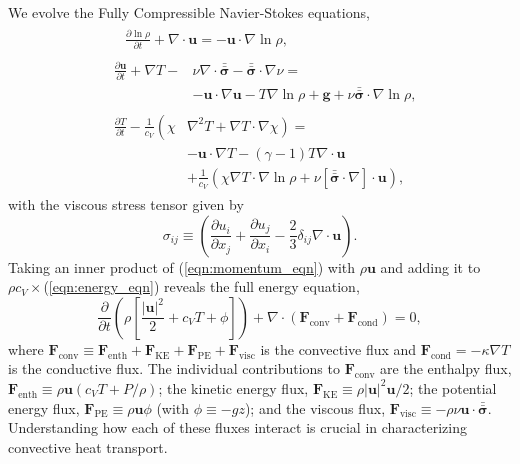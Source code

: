 \documentclass[aps, prl, twocolumn, nofootinbib, groupedaddress, amsfonts, amssymb, amsmath]{revtex4-1}
\newcommand{\Div}[1]{\ensuremath{\nabla\cdot\left( #1\right)}}
\newcommand{\grad}{\ensuremath{\nabla}}
\newcommand{\lilstressT}{\ensuremath{\bm{\bar{\bar{\sigma}}}}}
\begin{document}
We evolve the Fully Compressible Navier-Stokes equations,
\begin{align}
&\begin{aligned}
&\frac{\partial \ln\rho}{\partial t} + \grad\cdot\bm{u} 
    = -\bm{u}\cdot\grad\ln\rho,
	\label{eqn:continuity_eqn}
\end{aligned}\\
&\begin{aligned}
\frac{\partial\bm{u}}{\partial t} + \grad T - 
&\nu\grad\cdot\lilstressT - \lilstressT\cdot\grad\nu = \\
&-\bm{u}\cdot\grad\bm{u} - T\grad\ln\rho + \bm{g} + 
\nu\lilstressT\cdot\grad\ln\rho,
\label{eqn:momentum_eqn}
\end{aligned}\\
&\begin{aligned}
\frac{\partial T}{\partial t} -\frac{1}{c_V}\left(\right.\chi&\left.
    \grad^2 T + \grad T\cdot\grad\chi\right) = \\
	&-\bm{u}\cdot\grad T - (\gamma-1)T\grad\cdot{\bm{u}} \\
	&+ \frac{1}{c_V}\left(\chi\grad T \cdot\grad\ln\rho +
	\nu\left[\lilstressT\cdot\nabla\right]\cdot\bm{u}\right), 
	\label{eqn:energy_eqn}
\end{aligned}
\end{align}
with the viscous stress tensor given by
\begin{equation}
\sigma_{ij} \equiv \left(\frac{\partial u_i}{\partial x_j} + 
\frac{\partial u_j}{\partial x_i} - \frac{2}{3}\delta_{ij}\grad\cdot\bm{u}\right).
	\label{eqn:stress_tensor}
\end{equation}
Taking an inner product of
(\ref{eqn:momentum_eqn}) with $\rho\bm{u}$ and adding it to 
$\rho c_V\times$(\ref{eqn:energy_eqn}) reveals the full energy equation,
\begin{equation}
\frac{\partial}{\partial t}\left(\rho\left[\frac{|\bm{u}|^2}{2} + c_V T + \phi\right]\right) +
\Div{\bm{F}_{\text{conv}} + \bm{F}_{\text{cond}}} = 0,
	\label{eqn:energy_eqn_full}
\end{equation}
where
$
\bm{F}_{\text{conv}} \equiv \bm{F}_{\text{enth}} + \bm{F}_{\text{KE}} + \bm{F}_{\text{PE}} + \bm{F}_{\text{visc}}
$
is the convective flux and $\bm{F}_{\text{cond}} = -\kappa \grad T$
is the conductive flux.
The individual contributions to $\bm{F}_{\text{conv}}$ are the enthalpy flux, 
$\bm{F}_{\text{enth}} \equiv \rho\bm{u}(c_V T + P/\rho)$;
the kinetic energy flux, 
$\bm{F}_{\text{KE}} \equiv \rho|\bm{u}|^2\bm{u}/2$;
the potential energy flux,
$\bm{F}_{\text{PE}} \equiv \rho\bm{u}\phi$ (with $\phi \equiv -gz$);
and the viscous flux, 
$\bm{F}_{\text{visc}} \equiv -\rho\nu\bm{u}\cdot\lilstressT$.
Understanding how each of these fluxes interact  
is crucial in characterizing convective heat transport.
\end{document}
